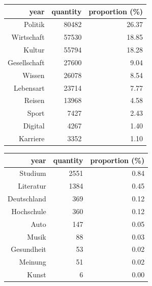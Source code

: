 \begin{description}
        \begin{table}[!htb]
        \begin{minipage}{.45\linewidth}
        \centering
        \begin{tabular}{rrr}
        \hline
            \textbf{year} &   \textbf{quantity} &   \textbf{proportion (\%)} \\
        \hline
         Politik      &      80482 &            26.37 \\
         Wirtschaft   &      57530 &            18.85 \\
         Kultur       &      55794 &            18.28 \\
         Gesellschaft &      27600 &             9.04 \\
         Wissen       &      26078 &             8.54 \\
         Lebensart    &      23714 &             7.77 \\
         Reisen       &      13968 &             4.58 \\
         Sport        &       7427 &             2.43 \\
         Digital      &       4267 &             1.40 \\
         Karriere     &       3352 &             1.10 \\
        \hline
        \end{tabular}
        \end{minipage}
        \begin{minipage}{.45\linewidth}
        \centering
        \begin{tabular}{rrr}
        \hline
            \textbf{year} &   \textbf{quantity} &   \textbf{proportion (\%)} \\
        \hline
         Studium      &       2551 &             0.84 \\
         Literatur    &       1384 &             0.45 \\
         Deutschland  &        369 &             0.12 \\
         Hochschule   &        360 &             0.12 \\
         Auto         &        147 &             0.05 \\
         Musik        &         88 &             0.03 \\
         Gesundheit   &         53 &             0.02 \\
         Meinung      &         51 &             0.02 \\
         Kunst        &          6 &             0.00 \\

\end{tabular}
\end{minipage}
\end{table}
\end{description}
